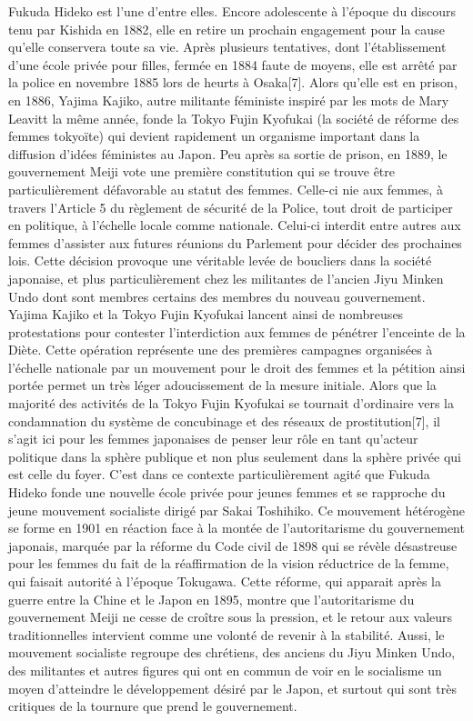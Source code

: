 \documentclass[11pt,a4paper]{article}
\begin{document}
Fukuda Hideko est l’une d’entre elles. Encore adolescente à l’époque du discours tenu par Kishida en 1882, elle en retire un prochain engagement pour la cause qu’elle conservera toute sa vie. Après plusieurs tentatives, dont l’établissement d’une école privée pour filles, fermée en 1884 faute de moyens, elle est arrêté par la police en novembre 1885 lors de heurts à Osaka{[}7{]}. Alors qu’elle est en prison, en 1886, Yajima Kajiko, autre militante féministe inspiré par les mots de Mary Leavitt la même année, fonde la Tokyo Fujin Kyofukai (la société de réforme des femmes tokyoïte) qui devient rapidement un organisme important dans la diffusion d’idées féministes au Japon. Peu après sa sortie de prison, en 1889, le gouvernement Meiji vote une première constitution qui se trouve être particulièrement défavorable au statut des femmes. Celle-ci nie aux femmes, à travers l’Article 5 du règlement de sécurité de la Police, tout droit de participer en politique, à l’échelle locale comme nationale. Celui-ci interdit entre autres aux femmes d’assister aux futures réunions du Parlement pour décider des prochaines lois. Cette décision provoque une véritable levée de boucliers dans la société japonaise, et plus particulièrement chez les militantes de l’ancien Jiyu Minken Undo dont sont membres certains des membres du nouveau gouvernement. Yajima Kajiko et la Tokyo Fujin Kyofukai lancent ainsi de nombreuses protestations pour contester l’interdiction aux femmes de pénétrer l’enceinte de la Diète. Cette opération représente une des premières campagnes organisées à l’échelle nationale par un mouvement pour le droit des femmes et la pétition ainsi portée permet un très léger adoucissement de la mesure initiale. Alors que la majorité des activités de la Tokyo Fujin Kyofukai se tournait d’ordinaire vers la condamnation du système de concubinage et des réseaux de prostitution{[}7{]}, il s’agit ici pour les femmes japonaises de penser leur rôle en tant qu’acteur politique dans la sphère publique et non plus seulement dans la sphère privée qui est celle du foyer. C’est dans ce contexte particulièrement agité que Fukuda Hideko fonde une nouvelle école privée pour jeunes femmes et se rapproche du jeune mouvement socialiste dirigé par Sakai Toshihiko. Ce mouvement hétérogène se forme en 1901 en réaction face à la montée de l’autoritarisme du gouvernement japonais, marquée par la réforme du Code civil de 1898 qui se révèle désastreuse pour les femmes du fait de la réaffirmation de la vision réductrice de la femme, qui faisait autorité à l’époque Tokugawa. Cette réforme, qui apparait après la guerre entre la Chine et le Japon en 1895, montre que l’autoritarisme du gouvernement Meiji ne cesse de croître sous la pression, et le retour aux valeurs traditionnelles intervient comme une volonté de revenir à la stabilité. Aussi, le mouvement socialiste regroupe des chrétiens, des anciens du Jiyu Minken Undo, des militantes et autres figures qui ont en commun de voir en le socialisme un moyen d’atteindre le développement désiré par le Japon, et surtout qui sont très critiques de la tournure que prend le gouvernement.
\end{document}
